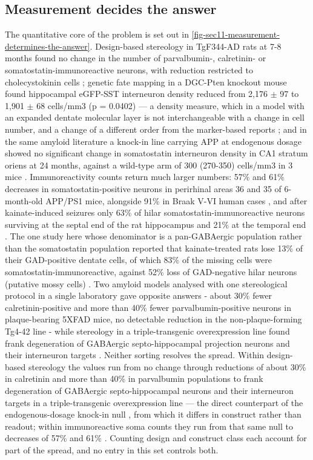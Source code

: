 \documentclass[11pt]{article}
\begin{document}
\subsection{Measurement decides the answer}
\label{sec-11-measurement}

The quantitative core of the problem is set out in \ref{fig-sec11-measurement-determines-the-answer}. Design-based stereology in TgF344-AD rats at 7-8 months found no change in the number of parvalbumin-, calretinin- or somatostatin-immunoreactive neurons, with reduction restricted to cholecystokinin cells \citep{Futacsi2025}; genetic fate mapping in a DGC-Pten knockout mouse found hippocampal eGFP-SST interneuron density reduced from 2,176 $\pm$ 97 to 1,901 $\pm$ 68 cells/mm3 (p = 0.0402) --- a density measure, which in a model with an expanded dentate molecular layer is not interchangeable with a change in cell number, and a change of a different order from the marker-based reports \citep{Drake2024}; and in the same amyloid literature a knock-in line carrying APP at endogenous dosage showed no significant change in somatostatin interneuron density in CA1 stratum oriens at 24 months, against a wild-type arm of 300 (270-350) cells/mm3 in 3 mice \citep{Sos2020}. Immunoreactivity counts return much larger numbers: 57\% and 61\% decreases in somatostatin-positive neurons in perirhinal areas 36 and 35 of 6-month-old APP/PS1 mice, alongside 91\% in Braak V-VI human cases \citep{SanchezMejias2019}, and after kainate-induced seizures only 63\% of hilar somatostatin-immunoreactive neurons surviving at the septal end of the rat hippocampus and 21\% at the temporal end \citep{Jolkkonen1997}. The one study here whose denominator is a pan-GABAergic population rather than the somatostatin population reported that kainate-treated rats lose 13\% of their GAD-positive dentate cells, of which 83\% of the missing cells were somatostatin-immunoreactive, against 52\% loss of GAD-negative hilar neurons (putative mossy cells) \citep{Buckmaster1999}. Two amyloid models analysed with one stereological protocol in a single laboratory gave opposite answers - about 30\% fewer calretinin-positive and more than 40\% fewer parvalbumin-positive neurons in plaque-bearing 5XFAD mice, no detectable reduction in the non-plaque-forming Tg4-42 line \citep{Giesers2020} - while stereology in a triple-transgenic overexpression line found frank degeneration of GABAergic septo-hippocampal projection neurons and their interneuron targets \citep{Loreth2012}. Neither sorting resolves the spread. Within design-based stereology the values run from no change \citep{Futacsi2025} through reductions of about 30\% in calretinin and more than 40\% in parvalbumin populations \citep{Giesers2020} to frank degeneration of GABAergic septo-hippocampal neurons and their interneuron targets in a triple-transgenic overexpression line \citep{Loreth2012} --- the direct counterpart of the endogenous-dosage knock-in null \citep{Sos2020}, from which it differs in construct rather than readout; within immunoreactive soma counts they run from that same null to decreases of 57\% and 61\% \citep{SanchezMejias2019}. Counting design and construct class each account for part of the spread, and no entry in this set controls both.
\end{document}
